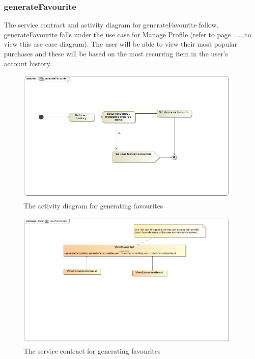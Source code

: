 \documentclass[a4paper,12pt]{article}
\begin{document}
\subsubsection{generateFavourite}
The service contract and activity diagram for generateFavourite follow. generateFavourite falls under the use case for Manage Profile (refer to page ..... to view this use case diagram). The user will be able to view their most popular purchases and these will be based on the most recurring item in the user's account history.
\begin{figure}[H]
  \centering
    \includegraphics[width=1.0\textwidth]{images/generateFavourite.png}
    \caption{The activity diagram for generating favourites} 
\end{figure}

\begin{figure}[H]
	\centering
	\includegraphics[width=1.0\textwidth]{images/viewFavouritesSC.jpg}
	\caption{The service contract for generating favourites}
\end{figure}
\end{document}
